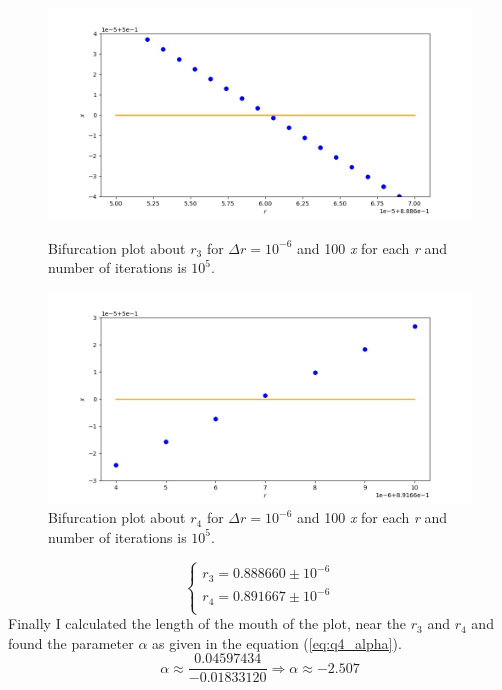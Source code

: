 \documentclass[12pt, a4paper]{article}
\begin{document}
	\begin{figure}
		\centering
		\begin{minipage}[b]{0.4\textwidth}
			\includegraphics[width=\textwidth]{../q4/q4_0.8886499999999999_0.88867_20_100_100000.jpg}
			\caption{Bifurcation plot about $r_3$ for $\Delta r=10^{-6}$ and 100 \textit{x} for each 
			\textit{r} and number of iterations is $10^5$.}
			\label{fig:q4_r3_prime}
		\end{minipage}
		\hfill
		\begin{minipage}[b]{0.4\textwidth}
			\includegraphics[width=\textwidth]{../q4/q4_0.891664_0.89167_7_100_1000000.jpg}
			\caption{Bifurcation plot about $r_4$ for $\Delta r=10^{-6}$ and 100 \textit{x} for each 
			\textit{r} and number of iterations is $10^5$.}
			\label{fig:q4_r4_prime}
		\end{minipage}
	\end{figure}
	\begin{equation}
		\begin{cases}
			r_3 = 0.888660 \pm 10^{-6} \\
			r_4 = 0.891667 \pm 10^{-6} \\
		\end{cases}
		\label{eq:q4_r_3_4_prime}
	\end{equation}
	Finally I calculated the length of the mouth of the plot, near the $r_3$ and $r_4$ and found the parameter $\alpha$ as given in the equation (\ref{eq:q4_alpha}).
	\begin{equation}
		\alpha \approx \frac{0.04597434}{-0.01833120} \Longrightarrow
		\alpha \approx -2.507
		\label{eq:q4_alpha}
	\end{equation}
\end{document}
